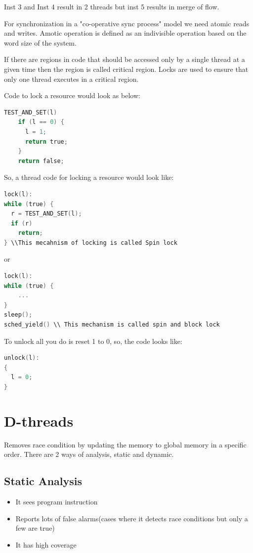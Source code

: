 \documentclass[twoside]{article}
\begin{document}
Inst 3 and Inst 4 result in 2 threads but inst 5 results in merge of flow.

For synchronization in a "co-operative sync process" model we need atomic reads and writes. Amotic operation is defined as an indivisible operation based on the word size of the system.

If there are regions in code that should be accessed only by a single thread at a given time then the region is called critical region. Locks are used to ensure that only one thread executes in a critical region. 

Code to lock a resource would look as below:

\begin{lstlisting}[language=C]
	TEST_AND_SET(l)
	if (l == 0) {
	  l = 1;
	  return true;
	}
	return false;
\end{lstlisting}

So, a thread code for locking a resource would look like:

\begin{lstlisting}[language=C]
lock(l):
while (true) {
  r = TEST_AND_SET(l);
  if (r)
    return;
} \\This mecahnism of locking is called Spin lock
\end{lstlisting}

or

\begin{lstlisting}[language=C]
lock(l):
while (true) {
	...
} 
sleep();
sched_yield() \\ This mechanism is called spin and block lock

\end{lstlisting}



To unlock all you do is reset 1 to 0, so, the code looks like:

\begin{lstlisting}[language=C]
unlock(l):
{
  l = 0;
}
\end{lstlisting}

\section{D-threads}

Removes race condition by updating the memory to global memory in a specific order. There are 2 ways of analysis, static and dynamic.

\subsection{Static Analysis}
\begin{itemize}
	\item It sees program instruction
	\item Reports lots of false alarms(cases where it detects race conditions but only a few are true)
	\item It has high coverage
\end{itemize}
\end{document}
